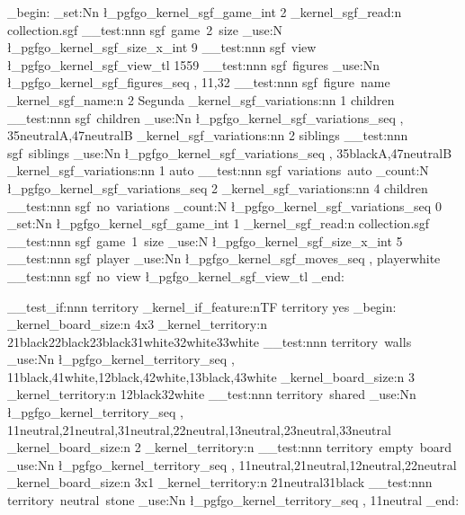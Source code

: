 \documentclass{article}
\begin{document}
\group_begin:
	\int_set:Nn \l_pgfgo_kernel_sgf_game_int {2}
	\pgfgo_kernel_sgf_read:n {collection.sgf}
	\__test:nnn {sgf~game~2~size} {\int_use:N \l_pgfgo_kernel_sgf_size_x_int} {9}
	\__test:nnn {sgf~view} {\l_pgfgo_kernel_sgf_view_tl} {{1}{5}{5}{9}}
	\__test:nnn {sgf~figures} {\seq_use:Nn \l_pgfgo_kernel_sgf_figures_seq {,}} {{1}{1},{3}{2}}
	\__test:nnn {sgf~figure~name} {\pgfgo_kernel_sgf_name:n {2}} {Segunda}
	\pgfgo_kernel_sgf_variations:nn {1} {children}
	\__test:nnn {sgf~children} {\seq_use:Nn \l_pgfgo_kernel_sgf_variations_seq {,}}
		{{3}{5}{neutral}{A},{4}{7}{neutral}{B}}
	\pgfgo_kernel_sgf_variations:nn {2} {siblings}
	\__test:nnn {sgf~siblings} {\seq_use:Nn \l_pgfgo_kernel_sgf_variations_seq {,}}
		{{3}{5}{black}{A},{4}{7}{neutral}{B}}
	\pgfgo_kernel_sgf_variations:nn {1} {auto}
	\__test:nnn {sgf~variations~auto} {\seq_count:N \l_pgfgo_kernel_sgf_variations_seq} {2}
	\pgfgo_kernel_sgf_variations:nn {4} {children}
	\__test:nnn {sgf~no~variations} {\seq_count:N \l_pgfgo_kernel_sgf_variations_seq} {0}
	\int_set:Nn \l_pgfgo_kernel_sgf_game_int {1}
	\pgfgo_kernel_sgf_read:n {collection.sgf}
	\__test:nnn {sgf~game~1~size} {\int_use:N \l_pgfgo_kernel_sgf_size_x_int} {5}
	\__test:nnn {sgf~player} {\seq_use:Nn \l_pgfgo_kernel_sgf_moves_seq {,}} {{player}{white}{}}
	\__test:nnn {sgf~no~view} {\l_pgfgo_kernel_sgf_view_tl} {}
\group_end:

\__test_if:nnn {territory} {\pgfgo_kernel_if_feature:nTF {territory}} {yes}
\group_begin:
	\pgfgo_kernel_board_size:n {4x3}
	\pgfgo_kernel_territory:n {{2}{1}{black}{2}{2}{black}{2}{3}{black}{3}{1}{white}{3}{2}{white}{3}{3}{white}}
	\__test:nnn {territory~walls} {\seq_use:Nn \l_pgfgo_kernel_territory_seq {,}}
		{{1}{1}{black},{4}{1}{white},{1}{2}{black},{4}{2}{white},{1}{3}{black},{4}{3}{white}}
	\pgfgo_kernel_board_size:n {3}
	\pgfgo_kernel_territory:n {{1}{2}{black}{3}{2}{white}}
	\__test:nnn {territory~shared} {\seq_use:Nn \l_pgfgo_kernel_territory_seq {,}}
		{{1}{1}{neutral},{2}{1}{neutral},{3}{1}{neutral},{2}{2}{neutral},{1}{3}{neutral},{2}{3}{neutral},{3}{3}{neutral}}
	\pgfgo_kernel_board_size:n {2}
	\pgfgo_kernel_territory:n {}
	\__test:nnn {territory~empty~board} {\seq_use:Nn \l_pgfgo_kernel_territory_seq {,}}
		{{1}{1}{neutral},{2}{1}{neutral},{1}{2}{neutral},{2}{2}{neutral}}
	\pgfgo_kernel_board_size:n {3x1}
	\pgfgo_kernel_territory:n {{2}{1}{neutral}{3}{1}{black}}
	\__test:nnn {territory~neutral~stone} {\seq_use:Nn \l_pgfgo_kernel_territory_seq {,}} {{1}{1}{neutral}}
\group_end:
\end{document}
